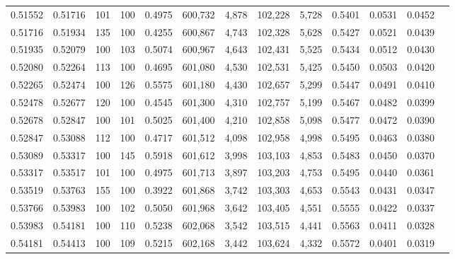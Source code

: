 \begin{tabular}{rrrrrrrrrrrrr}
0.51552 & 0.51716 &   101 & 100 &                                     0.4975 & 600,732 &   4,878 & 102,228 &   5,728 & 0.5401 & 0.0531 & 0.0452 \\
0.51716 & 0.51934 &   135 & 100 &                                     0.4255 & 600,867 &   4,743 & 102,328 &   5,628 & 0.5427 & 0.0521 & 0.0439 \\
0.51935 & 0.52079 &   100 & 103 &                                     0.5074 & 600,967 &   4,643 & 102,431 &   5,525 & 0.5434 & 0.0512 & 0.0430 \\
0.52080 & 0.52264 &   113 & 100 &                                     0.4695 & 601,080 &   4,530 & 102,531 &   5,425 & 0.5450 & 0.0503 & 0.0420 \\
0.52265 & 0.52474 &   100 & 126 &                                     0.5575 & 601,180 &   4,430 & 102,657 &   5,299 & 0.5447 & 0.0491 & 0.0410 \\
0.52478 & 0.52677 &   120 & 100 &                                     0.4545 & 601,300 &   4,310 & 102,757 &   5,199 & 0.5467 & 0.0482 & 0.0399 \\
0.52678 & 0.52847 &   100 & 101 &                                     0.5025 & 601,400 &   4,210 & 102,858 &   5,098 & 0.5477 & 0.0472 & 0.0390 \\
0.52847 & 0.53088 &   112 & 100 &                                     0.4717 & 601,512 &   4,098 & 102,958 &   4,998 & 0.5495 & 0.0463 & 0.0380 \\
0.53089 & 0.53317 &   100 & 145 &                                     0.5918 & 601,612 &   3,998 & 103,103 &   4,853 & 0.5483 & 0.0450 & 0.0370 \\
0.53317 & 0.53517 &   101 & 100 &                                     0.4975 & 601,713 &   3,897 & 103,203 &   4,753 & 0.5495 & 0.0440 & 0.0361 \\
0.53519 & 0.53763 &   155 & 100 &                                     0.3922 & 601,868 &   3,742 & 103,303 &   4,653 & 0.5543 & 0.0431 & 0.0347 \\
0.53766 & 0.53983 &   100 & 102 &                                     0.5050 & 601,968 &   3,642 & 103,405 &   4,551 & 0.5555 & 0.0422 & 0.0337 \\
0.53983 & 0.54181 &   100 & 110 &                                     0.5238 & 602,068 &   3,542 & 103,515 &   4,441 & 0.5563 & 0.0411 & 0.0328 \\
0.54181 & 0.54413 &   100 & 109 &                                     0.5215 & 602,168 &   3,442 & 103,624 &   4,332 & 0.5572 & 0.0401 & 0.0319 \\

\end{tabular}
